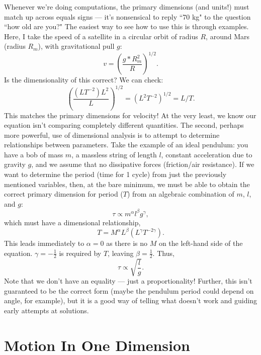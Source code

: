 \documentclass[letterpaper,12pt]{article}
\begin{document}
Whenever we're doing computations, the primary dimensions (and units!) must match up across equals signs --- it's nonsensical to reply ``70 kg" to the question ``how old are you?" The easiest way to see how to use this is through examples. Here, I take the speed of a satellite in a circular orbit of radius $R$, around Mars (radius $R_m$), with gravitational pull $g$:
\begin{equation}
v = \left(\frac{g*R_m^2}{R}\right)^{1/2}.
\end{equation}
Is the dimensionality of this correct? We can check:
\begin{equation}
\left(\frac{(LT^{-2})L^2}{L}\right)^{1/2} =(L^2T^{-2})^{1/2}=L/T.
\end{equation}
This matches the primary dimensions for velocity! At the very least, we know our equation isn't comparing completely different quantities.
The second, perhaps more powerful, use of dimensional analysis is to attempt to determine relationships between parameters. Take the example of an ideal pendulum: you have a bob of mass $m$, a massless string of length $l$, constant acceleration due to gravity $g$, and we assume that no dissipative forces (friction/air resistance). If we want to determine the period (time for 1 cycle) from just the previously mentioned variables, then, at the bare minimum, we must be able to obtain the correct primary dimension for period ($T$) from an algebraic combination of $m$, $l$, and $g$:
\begin{equation}
\tau \propto m^\alpha l^\beta g^\gamma,
\end{equation} 
which must have a dimensional relationship,
\begin{equation}
T = M^\alpha L^\beta (L^\gamma T^{-2\gamma}).
\end{equation}
This leads immediately to $\alpha = 0$ as there is no $M$ on the left-hand side of the equation. $\gamma = -\frac{1}{2}$ is required by $T$, leaving $\beta = \frac{1}{2}$. Thus,
\begin{equation}
\tau \propto \sqrt{\frac{l}{g}}.
\end{equation}
Note that we don't have an equality --- just a proportionality! Further, this isn't guaranteed to be the correct form (maybe the pendulum period could depend on angle, for example), but it is a good way of telling what doesn't work and guiding early attempts at solutions.

\section{Motion In One Dimension}\label{1D}
\end{document}
